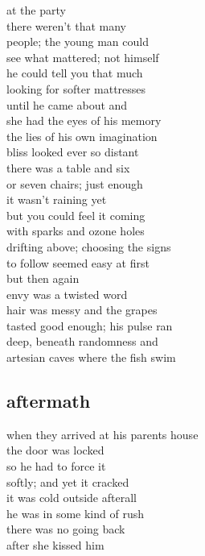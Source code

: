 \documentclass{article}
\begin{document}
at the party\\
there weren't that many\\
people; the young man could\\
see what mattered; not himself\\
he could tell you that much\\
looking for softer mattresses\\
until he came about and\\
she had the eyes of his memory\\
the lies of his own imagination\\
bliss looked ever so distant\\

there was a table and six\\
or seven chairs; just enough\\
it wasn't raining yet\\
but you could feel it coming\\
with sparks and ozone holes\\
drifting above; choosing the signs\\
to follow seemed easy at first\\

but then again\\
envy was a twisted word\\
hair was messy and the grapes\\
tasted good enough; his pulse ran\\
deep, beneath randomness and\\
artesian caves where the fish swim\\
\clearpage


\subsection{aftermath}


when they arrived at his parents house\\
the door was locked\\
so he had to force it\\
softly; and yet it cracked\\
it was cold outside afterall\\
he was in some kind of rush\\
there was no going back\\
after she kissed him\\
\end{document}

